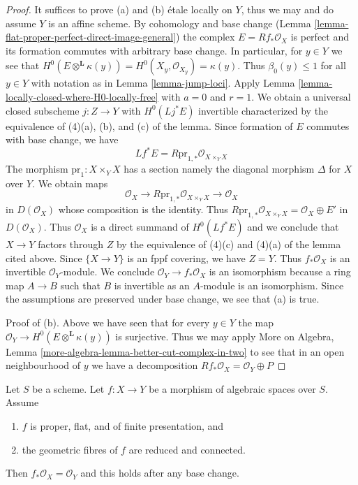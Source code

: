 \begin{proof}
It suffices to prove (a) and (b) \'etale locally on $Y$, thus we may and do
assume $Y$ is an affine scheme.
By cohomology and base change
(Lemma \ref{lemma-flat-proper-perfect-direct-image-general})
the complex $E = Rf_*\mathcal{O}_X$
is perfect and its formation commutes with arbitrary base change.
In particular, for $y \in Y$ we see that
$H^0(E \otimes^\mathbf{L} \kappa(y)) =
H^0(X_y, \mathcal{O}_{X_y}) = \kappa(y)$.
Thus $\beta_0(y) \leq 1$ for all $y \in Y$ with notation as in
Lemma \ref{lemma-jump-loci}. Apply
Lemma \ref{lemma-locally-closed-where-H0-locally-free}
with $a = 0$ and $r = 1$. We obtain a universal closed subscheme
$j : Z \to Y$ with $H^0(Lj^*E)$ invertible characterized
by the equivalence of (4)(a), (b), and (c) of the lemma.
Since formation of $E$ commutes with base change, we have
$$
Lf^*E = R\text{pr}_{1, *}\mathcal{O}_{X \times_Y X}
$$
The morphism $\text{pr}_1 : X \times_Y X$ has a section
namely the diagonal morphism $\Delta$ for $X$ over $Y$.
We obtain maps
$$
\mathcal{O}_X \longrightarrow R\text{pr}_{1, *}\mathcal{O}_{X \times_Y X}
\longrightarrow \mathcal{O}_X
$$
in $D(\mathcal{O}_X)$ whose composition is the identity. Thus
$R\text{pr}_{1, *}\mathcal{O}_{X \times_Y X} = \mathcal{O}_X \oplus E'$
in $D(\mathcal{O}_X)$. Thus $\mathcal{O}_X$ is a direct summand of
$H^0(Lf^*E)$ and we conclude that $X \to Y$ factors through $Z$
by the equivalence of (4)(c) and (4)(a) of the lemma cited above.
Since $\{X \to Y\}$ is an fppf covering, we have $Z = Y$.
Thus $f_*\mathcal{O}_X$ is an invertible $\mathcal{O}_Y$-module.
We conclude $\mathcal{O}_Y \to f_*\mathcal{O}_X$ is an isomorphism
because a ring map $A \to B$ such that $B$ is invertible as an $A$-module
is an isomorphism. Since the assumptions are preserved under base
change, we see that (a) is true.

\medskip\noindent
Proof of (b). Above we have seen that for every $y \in Y$ the map
$\mathcal{O}_Y \to H^0(E \otimes^\mathbf{L} \kappa(y))$ is surjective.
Thus we may apply
More on Algebra, Lemma \ref{more-algebra-lemma-better-cut-complex-in-two}
to see that in an open neighbourhood of $y$ we have
a decomposition $Rf_*\mathcal{O}_X = \mathcal{O}_Y \oplus P$
\end{proof}

\begin{lemma}
\label{lemma-proper-flat-geom-red-connected}
Let $S$ be a scheme.
Let $f : X \to Y$ be a morphism of algebraic spaces over $S$. Assume
\begin{enumerate}
\item $f$ is proper, flat, and of finite presentation, and
\item the geometric fibres of $f$ are reduced and connected.
\end{enumerate}
Then $f_*\mathcal{O}_X = \mathcal{O}_Y$ and this holds
after any base change.
\end{lemma}

